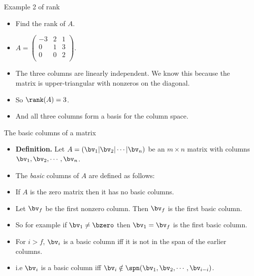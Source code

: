 \documentclass{beamer}
\begin{document}
\begin{frame}{Example 2 of rank}

\begin{itemize}
\item Find the rank of $A$.
\item $A=
\begin{pmatrix}
-3  & 2  & 1 \\
0   & 1  & 3 \\
0   & 0  & 2 \\
\end{pmatrix}
$.
\item The three columns are linearly independent. We know this because the
matrix is upper-triangular with nonzeros on the diagonal.
\item So $\rank(A) = 3$.
\item And all three columns form a basis for the column space.
\end{itemize}

\end{frame}


\begin{frame}{The basic columns of a matrix}

\begin{itemize}
\item \textbf{Definition.} Let $A = \left(\bv_1 \vert \bv_2 \vert \cdots \vert \bv_n\right)$
be an $m\times n$ matrix with columns $\bv_1,\bv_2,\cdots,\bv_n$.
\item The \emph{basic} columns of $A$ are defined as follows:
\item If $A$ is the zero matrix then it has no basic columns.
\item Let $\bv_f$ be the first nonzero column. Then $\bv_f$ is the first basic column.
\item So for example if $\bv_1\not=\bzero$ then $\bv_1 = \bv_f$ is the first basic column.
\item For $i>f$, $\bv_i$ is a basic column iff it is not in the span of the earlier columns.
\item i.e $\bv_i$ is a basic column iff $\bv_i\notin\spn(\bv_1,\bv_2,\cdots,\bv_{i-i})$.
\end{itemize}

\end{frame}

\end{document}
